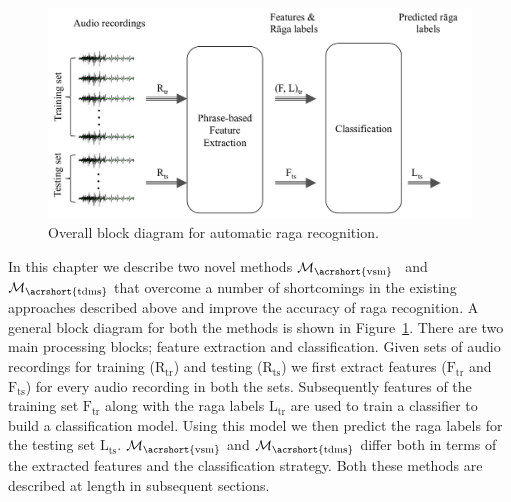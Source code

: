 \begin{figure}
	\begin{center}
		\includegraphics[width=\figSizeHundred]{ch07_ragaRecognition/figures/bd_overall_phasebased_raga_recognition.pdf}
	\end{center}
	\caption{Overall block diagram for automatic \gls{raga} recognition.}
	\label{fig:bd_raga_recognition}
\end{figure}



In this chapter we describe two novel methods $\mathcal{M}_\mathrm{\acrshort{vsm}}$~ and $\mathcal{M}_\mathrm{\acrshort{tdms}}$ that overcome a number of shortcomings in the existing approaches described above and improve the accuracy of \gls{raga} recognition. A general block diagram for both the methods is shown in Figure~\ref{fig:bd_raga_recognition}. There are two main processing blocks; feature extraction and classification. Given sets of audio recordings for training ($\mathrm{R}_\mathrm{tr}$) and testing ($\mathrm{R}_\mathrm{ts}$) we first extract features ($\mathrm{F}_\mathrm{tr}$ and $\mathrm{F}_\mathrm{ts}$) for every audio recording in both the sets. Subsequently features of the training set $\mathrm{F}_\mathrm{tr}$ along with the \gls{raga} labels $\mathrm{L}_\mathrm{tr}$ are used to train a classifier to build a classification model. Using this model we then predict the \gls{raga} labels for the testing set $\mathrm{L}_\mathrm{ts}$. $\mathcal{M}_\mathrm{\acrshort{vsm}}$ and $\mathcal{M}_\mathrm{\acrshort{tdms}}$ differ both in terms of the extracted features and the classification strategy. Both these methods are described at length in subsequent sections.


\section{}
\label{sec:phrase_based_feature_extraction}

